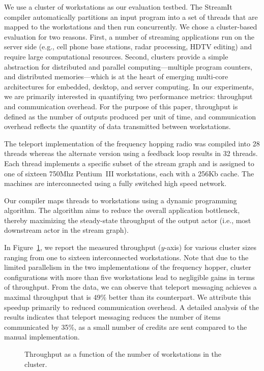 We use a cluster of workstations as our evaluation testbed.  The
StreamIt compiler automatically partitions an input program into a set
of threads that are mapped to the workstations and then run
concurrently.  We chose a cluster-based evaluation for two reasons.
First, a number of streaming applications run on the server side
(e.g., cell phone base stations, radar processing, HDTV editing) and
require large computational resources. Second, clusters provide a
simple abstraction for distributed and parallel computing---multiple
program counters, and distributed memories---which is at the heart of
emerging multi-core architectures for embedded, desktop, and server
computing.  In our experiments, we are primarily interested in
quantifying two performance metrics: throughput and communication
overhead.  For the purpose of this paper, throughput is defined as the
number of outputs produced per unit of time, and communication
overhead reflects the quantity of data transmitted between
workstations.

The teleport implementation of the frequency hopping radio was
compiled into 28 threads whereas the alternate version using a
feedback loop results in 32 threads.  Each thread implements a
specific subset of the stream graph and is assigned to one of sixteen
750Mhz Pentium~III workstations, each with a 256Kb cache.  The
machines are interconnected using a fully switched high speed network.

Our compiler maps threads to workstations using a dynamic programming
algorithm.  The algorithm aims to reduce the overall application
bottleneck, thereby maximizing the steady-state throughput of the
output actor (i.e., most downstream actor in the stream graph).

In Figure~\ref{fig:fhr-throughput}, we report the measured throughput
($y$-axis) for various cluster sizes ranging from one to sixteen
interconnected workstations. Note that due to the limited parallelism
in the two implementations of the frequency hopper, cluster
configurations with more than five workstations lead to negligible
gains in terms of throughput. From the data, we can observe that
teleport messaging achieves a maximal throughput that is 49\% better
than its counterpart.  We attribute this speedup primarily to reduced
communication overhead.  A detailed analysis of the results indicates
that teleport messaging reduces the number of items communicated by
35\%, as a small number of credits are sent compared to the manual
implementation.

\begin{figure}[t]
\vspace{-16pt}
\vspace{-20pt}
\caption{\small Throughput as a function of the number of workstations
in the cluster. 
\protect\label{fig:fhr-throughput}}
\vspace{-6pt}
\end{figure}

